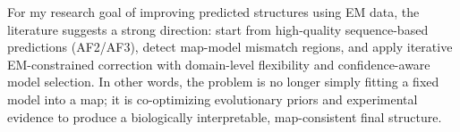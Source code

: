 \documentclass[12pt]{article}
\begin{document}
For my research goal of improving predicted structures using EM data, the literature suggests a strong direction: start from high-quality sequence-based predictions (AF2/AF3), detect map-model mismatch regions, and apply iterative EM-constrained correction with domain-level flexibility and confidence-aware model selection. In other words, the problem is no longer simply fitting a fixed model into a map; it is co-optimizing evolutionary priors and experimental evidence to produce a biologically interpretable, map-consistent final structure.




% 
% 
\end{document}

